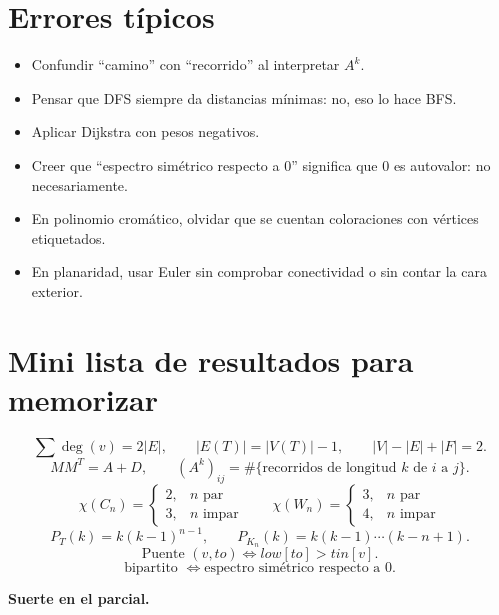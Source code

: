 \documentclass[11pt,a4paper]{article}
\begin{document}
\section{Errores típicos}
\begin{itemize}
    \item Confundir ``camino'' con ``recorrido'' al interpretar $A^k$.
    \item Pensar que DFS siempre da distancias mínimas: no, eso lo hace BFS.
    \item Aplicar Dijkstra con pesos negativos.
    \item Creer que ``espectro simétrico respecto a 0'' significa que $0$ es autovalor: no necesariamente.
    \item En polinomio cromático, olvidar que se cuentan coloraciones con vértices etiquetados.
    \item En planaridad, usar Euler sin comprobar conectividad o sin contar la cara exterior.
\end{itemize}

\section{Mini lista de resultados para memorizar}
\[
\sum \deg(v)=2|E|,
\qquad
|E(T)|=|V(T)|-1,
\qquad
|V|-|E|+|F|=2.
\]
\[
MM^T=A+D,
\qquad
(A^k)_{ij}=\#\{\text{recorridos de longitud }k\text{ de }i\text{ a }j\}.
\]
\[
\chi(C_n)=\begin{cases}2,&n\text{ par}\\3,&n\text{ impar}\end{cases}
\qquad
\chi(W_n)=\begin{cases}3,&n\text{ par}\\4,&n\text{ impar}\end{cases}
\]
\[
P_T(k)=k(k-1)^{n-1},
\qquad
P_{K_n}(k)=k(k-1)\cdots(k-n+1).
\]
\[
\text{Puente }(v,to) \iff low[to]>tin[v].
\]
\[
\text{bipartito }\iff \text{espectro simétrico respecto a }0.
\]

\bigskip
\begin{center}
\Large\textbf{Suerte en el parcial.}
\end{center}
\end{document}
